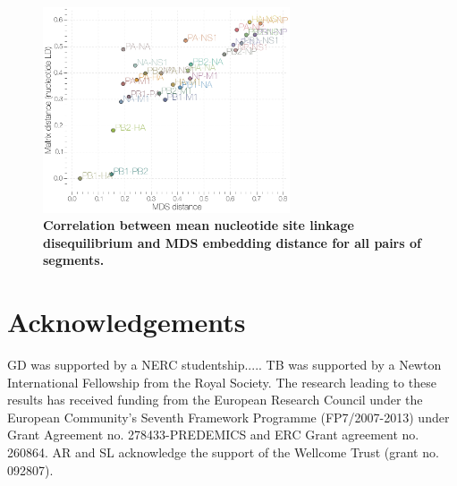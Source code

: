 \documentclass[11pt,oneside,letterpaper]{article}
\begin{document}
\begin{figure}
\centering  
\includegraphics[width=0.65\textwidth]  {supp_figures/InfB_ntLD_MatrixMDScorr.png}
\caption{\textbf{Correlation between mean nucleotide site linkage disequilibrium and MDS embedding distance for all pairs of segments.}}
\label{MDSntCorr}
\end{figure}

\section*{Acknowledgements}
GD was supported by a NERC studentship..... 
TB was supported by a Newton International Fellowship from the Royal Society. 
The research leading to these results has received funding from the European Research Council under the European Community's Seventh Framework Programme (FP7/2007-2013) under Grant Agreement no. 278433-PREDEMICS and ERC Grant agreement no. 260864.
AR and SL acknowledge the support of the Wellcome Trust (grant no. 092807).



\end{document}

